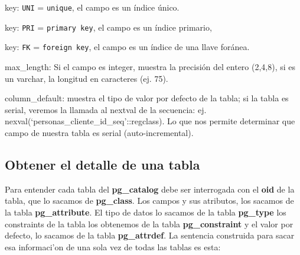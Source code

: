 key: \texttt{UNI} = \texttt{unique}, el campo es un \'indice \'unico.

 
key:	 \texttt{PRI} = \texttt{primary key}, el campo es un \'indice primario, 

key:	 \texttt{FK} = \texttt{foreign key}, el campo es un \'indice de una llave for\'anea.

max\_length: Si el campo es integer, muestra la precisi\'on del entero (2,4,8), si es un varchar, la longitud en caracteres (ej. 75).

column\_default: muestra el tipo de valor por defecto de la tabla; si la tabla es serial, veremos la llamada al nextval de la secuencia: ej. nexval(‘personas\_cliente\_id\_seq'::regclass). Lo que nos permite determinar que campo de nuestra tabla es serial (auto-incremental).

\subsection{Obtener el detalle de una tabla} 
Para entender cada tabla del \textbf{pg\_catalog} debe ser interrogada con el \textbf{oid} de la tabla, que lo sacamos de \textbf{pg\_class}.
Los campos y sus atributos, los sacamos de la tabla \textbf{pg\_attribute}.
El tipo de datos lo sacamos de la tabla \textbf{pg\_type}
los constraints de la tabla los obtenemos de la tabla \textbf{pg\_constraint}
y el valor por defecto, lo sacamos de la tabla \textbf{pg\_attrdef}.
La sentencia construida para sacar esa informaci'on de una sola vez de todas las tablas es esta:
